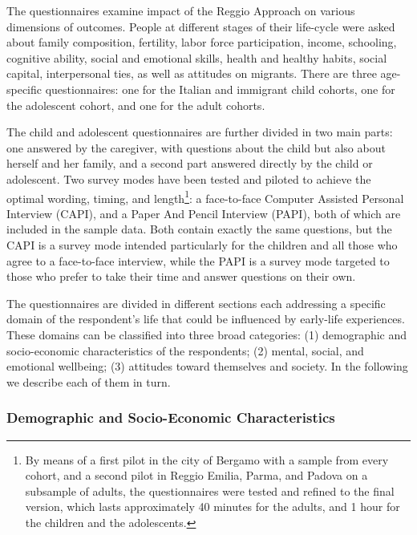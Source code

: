 The questionnaires examine impact of the Reggio Approach on various dimensions of
outcomes. People at different stages of their life-cycle were asked about
family composition, fertility, labor force participation, income, schooling,
cognitive ability, social and emotional skills, health and healthy habits,
social capital, interpersonal ties, as well as attitudes on migrants. There are three age-specific questionnaires: one for the
Italian and immigrant child cohorts, one for the adolescent cohort, and one for the adult cohorts.

The child and adolescent questionnaires are further divided in
two main parts: one answered by the caregiver, with questions about the
child but also about herself and her family, and a second part answered
directly by the child or adolescent. Two survey modes have been tested and
piloted to achieve the optimal wording, timing, and length\footnote{By
means of a first pilot in the city of Bergamo with a sample from every
cohort, and a second pilot in Reggio Emilia, Parma, and Padova on a
subsample of adults, the questionnaires were tested and refined to the final
version, which lasts approximately 40 minutes for the adults, and 1 hour for
the children and the adolescents.}: a face-to-face
Computer Assisted Personal Interview (CAPI), and a Paper And Pencil
Interview (PAPI), both of which are included in the sample data. Both contain exactly the same questions, but the CAPI is a
survey mode intended particularly for the children and all those who agree
to a face-to-face interview, while the PAPI is a survey mode targeted to
those who prefer to take their time and answer questions on their own.

The questionnaires are divided in different sections each addressing a specific domain of the
respondent's life that could be influenced by early-life experiences. These
domains can be classified into three broad categories: (1) demographic and
socio-economic characteristics of the respondents; (2) mental, social, and
emotional wellbeing; (3) attitudes toward themselves and society. In the
following we describe each of them in turn.

\subsubsection{Demographic and Socio-Economic Characteristics}


